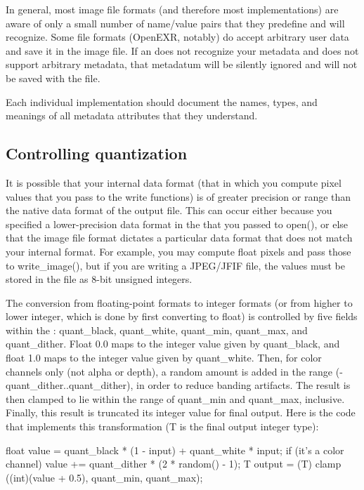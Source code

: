 In general, most image file formats (and therefore most \ImageOutput
implementations) are aware of only a small number of name/value pairs
that they predefine and will recognize.  Some file formats (OpenEXR,
notably) do accept arbitrary user data and save it in the image file.
If an \ImageOutput does not recognize your metadata and does not support
arbitrary metadata, that metadatum will be silently ignored and will not
be saved with the file.

Each individual \ImageOutput implementation should document the names,
types, and meanings of all metadata attributes that they understand.


\subsection{Controlling quantization}
\label{sec:imageoutput:quantization}

It is possible that your internal data format (that in which you compute
pixel values that you pass to the {\cf write} functions) is of greater
precision or range than the native data format of the output file.  This
can occur either because you specified a lower-precision data format in
the \ImageSpec that you passed to {\cf open()}, or else that the
image file format dictates a particular data format that does not match
your internal format.  For example, you may compute {\cf float} pixels
and pass those to {\cf write_image()}, but if you are writing a
JPEG/JFIF file, the values must be stored in the file as 8-bit unsigned
integers.

The conversion from floating-point formats to integer formats (or from
higher to lower integer, which is done by first converting to float) is
controlled by five fields within the \ImageSpec: {\cf
  quant_black}, {\cf quant_white}, {\cf quant_min}, {\cf quant_max},
and {\cf quant_dither}.
Float 0.0 maps to the integer value given by {\cf quant_black}, and
float 1.0 maps to the integer value given by {\cf quant_white}.  Then,
for color channels only (not alpha or depth), a random amount is added
in the range ({\cf -quant_dither..quant_dither}), in order to reduce
banding artifacts.  The result is then clamped to lie within the range of
{\cf quant_min} and {\cf quant_max}, inclusive.  Finally, this result is
truncated its integer value for final output.  Here is the code that
implements this transformation ({\cf T} is the final output integer
type):

\begin{code}
        float value = quant_black * (1 - input) + quant_white * input;
        if (it's a color channel)
            value += quant_dither * (2 * random() - 1);
        T output = (T) clamp ((int)(value + 0.5), quant_min, quant_max);
\end{code}

